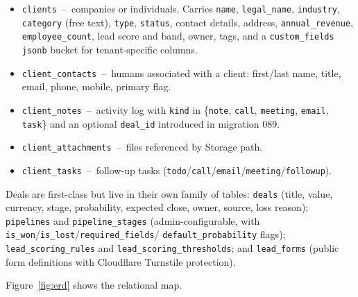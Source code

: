 \documentclass[11pt,a4paper,oneside]{article}
\newcommand{\code}[1]{\texttt{\small #1}}
\newcommand{\dash}{\,--\,}
\begin{document}
\begin{itemize}
  \item \code{clients} \dash{} companies or individuals. Carries
    \code{name}, \code{legal\_name}, \code{industry},
    \code{category} (free text), \code{type}, \code{status},
    contact details, address, \code{annual\_revenue},
    \code{employee\_count}, lead score and band, owner, tags, and a
    \code{custom\_fields jsonb} bucket for tenant-specific columns.
  \item \code{client\_contacts} \dash{} humans associated with a client:
    first/last name, title, email, phone, mobile, primary flag.
  \item \code{client\_notes} \dash{} activity log with
    \code{kind} in \{\code{note}, \code{call}, \code{meeting},
    \code{email}, \code{task}\} and an optional \code{deal\_id}
    introduced in migration 089.
  \item \code{client\_attachments} \dash{} files referenced by Storage
    path.
  \item \code{client\_tasks} \dash{} follow-up tasks
    (\code{todo}/\code{call}/\code{email}/\code{meeting}/\code{followup}).
\end{itemize}

Deals are first-class but live in their own family of tables:
\code{deals} (title, value, currency, stage, probability, expected
close, owner, source, loss reason); \code{pipelines} and
\code{pipeline\_stages} (admin-configurable, with
\code{is\_won}/\code{is\_lost}/\code{required\_fields}/
\code{default\_probability} flags); \code{lead\_scoring\_rules} and
\code{lead\_scoring\_thresholds}; and \code{lead\_forms} (public form
definitions with Cloudflare Turnstile protection).

Figure~\ref{fig:erd} shows the relational map.
\end{document}
